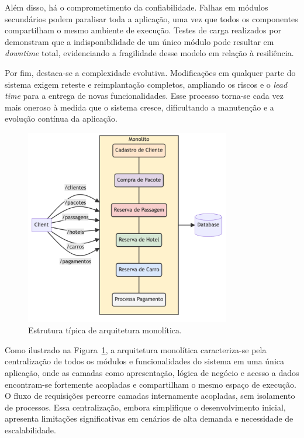Além disso, há o comprometimento da confiabilidade. Falhas em módulos secundários podem paralisar toda a aplicação, uma vez que todos os componentes compartilham o mesmo ambiente de execução. Testes de carga realizados por \cite{farhan2023performance} demonstram que a indisponibilidade de um único módulo pode resultar em \textit{downtime} total, evidenciando a fragilidade desse modelo em relação à resiliência.

Por fim, destaca-se a complexidade evolutiva. Modificações em qualquer parte do sistema exigem reteste e reimplantação completos, ampliando os riscos e o \textit{lead time} para a entrega de novas funcionalidades. Esse processo torna-se cada vez mais oneroso à medida que o sistema cresce, dificultando a manutenção e a evolução contínua da aplicação.

\begin{figure}[H]
\centering
\includegraphics[width=0.8\textwidth]{images/monolito.png}
\caption{Estrutura típica de arquitetura monolítica.}
\label{fig:monolitico}
\end{figure}

Como ilustrado na Figura~\ref{fig:monolitico}, a arquitetura monolítica caracteriza-se pela centralização de todos os módulos e funcionalidades do sistema em uma única aplicação, onde as camadas como apresentação, lógica de negócio e acesso a dados encontram-se fortemente acopladas e compartilham o mesmo espaço de execução. O fluxo de requisições percorre camadas internamente acopladas, sem isolamento de processos. Essa centralização, embora simplifique o desenvolvimento inicial, apresenta limitações significativas em cenários de alta demanda e necessidade de escalabilidade.

